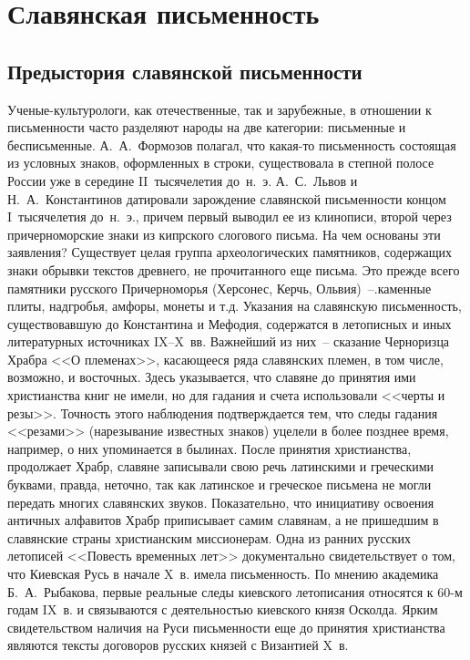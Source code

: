   \section{Славянская письменность}  
  \subsection{Предыстория славянской письменности}
  
  Ученые-культурологи, как отечественные, так и зарубежные, в отношении к
  письменности часто разделяют народы на две категории: письменные и
  бесписьменные. А.~А.~Формозов полагал, что какая-то письменность состоящая из
  условных знаков, оформленных в строки, существовала в степной полосе России
  уже в середине II~тысячелетия до~н.~э. А.~С.~Львов и Н.~А.~Константинов
  датировали зарождение славянской письменности концом I~тысячелетия до~н.~э.,
  причем первый выводил ее из клинописи, второй через причерноморские знаки из
  кипрского слогового письма. На чем основаны эти заявления? Существует целая
  группа археологических памятников, содержащих знаки обрывки текстов древнего,
  не прочитанного еще письма. Это прежде всего памятники русского Причерноморья
  (Херсонес, Керчь, Ольвия)~--.каменные плиты, надгробья, амфоры, монеты и т.д.
  Указания на славянскую письменность, существовавшую до Константина и Мефодия,
  содержатся в летописных и иных литературных источниках IX--X~вв. Важнейший из
  них~-- сказание Черноризца Храбра <<О племенах>>, касающееся ряда славянских
  племен, в том числе, возможно, и восточных. Здесь указывается, что славяне до
  принятия ими христианства книг не имели, но для гадания и счета использовали
  <<черты и резы>>. Точность этого наблюдения подтверждается тем, что следы
  гадания <<резами>> (нарезывание известных знаков) уцелели в более позднее
  время, например, о них упоминается в былинах. После принятия христианства,
  продолжает Храбр, славяне записывали свою речь латинскими и греческими
  буквами, правда, неточно, так как латинское и греческое письмена не могли
  передать многих славянских звуков. Показательно, что инициативу освоения
  античных алфавитов Храбр приписывает самим славянам, а не пришедшим в
  славянские страны христианским миссионерам. Одна из ранних русских летописей
  <<Повесть временных лет>> документально свидетельствует о том, что Киевская
  Русь в начале X~в. имела письменность. По мнению академика Б.~А.~Рыбакова,
  первые реальные следы киевского летописания относятся к 60-м годам IX~в. и
  связываются с деятельностью киевского князя Осколда. Ярким свидетельством
  наличия на Руси письменности еще до принятия христианства являются тексты
  договоров русских князей с Византией X~в.
  
